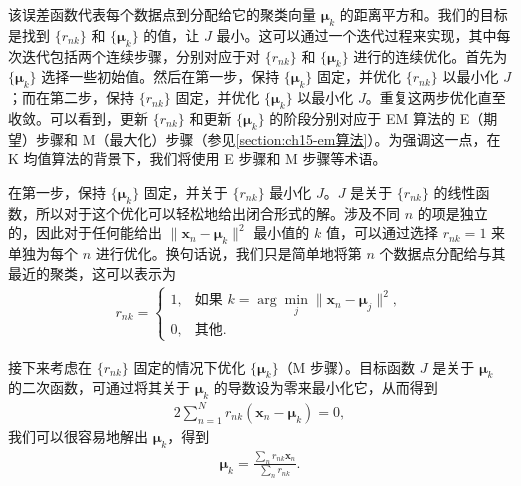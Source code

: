 \documentclass[../../main.tex]{subfiles}
\begin{document}
该误差函数代表每个数据点到分配给它的聚类向量 $\bm{\mu}_k$ 的距离平方和。我们的目标是找到 $\{r_{nk}\}$ 和 $\{\bm{\mu}_k\}$ 的值，让 $J$ 最小。这可以通过一个迭代过程来实现，其中每次迭代包括两个连续步骤，分别对应于对 $\{r_{nk}\}$ 和 $\{\bm{\mu}_k\}$ 进行的连续优化。首先为 $\{\bm{\mu}_k\}$ 选择一些初始值。然后在第一步，保持 $\{\bm{\mu}_k\}$ 固定，并优化 $\{r_{nk}\}$ 以最小化 $J$；而在第二步，保持 $\{r_{nk}\}$ 固定，并优化 $\{\bm{\mu}_k\}$ 以最小化 $J$。重复这两步优化直至收敛。可以看到，更新 $\{r_{nk}\}$ 和更新 $\{\bm{\mu}_k\}$ 的阶段分别对应于 EM 算法的 E（期望）步骤和 M（最大化）步骤（参见\cref{section:ch15-em算法}）。为强调这一点，在 K 均值算法的背景下，我们将使用 E 步骤和 M 步骤等术语。

在第一步，保持 $\{\bm{\mu}_k\}$ 固定，并关于 $\{r_{nk}\}$ 最小化 $J$。$J$ 是关于 $\{r_{nk}\}$ 的线性函数，所以对于这个优化可以轻松地给出闭合形式的解。涉及不同 $n$ 的项是独立的，因此对于任何能给出 $\|\bm{x}_n-\bm{\mu}_k\|^2$ 最小值的 $k$ 值，可以通过选择 $r_{nk}=1$ 来单独为每个 $n$ 进行优化。换句话说，我们只是简单地将第 $n$ 个数据点分配给与其最近的聚类，这可以表示为
\begin{align}
r_{nk}=
\begin{cases}
1, & \text{如果 }k=\arg\min_j\|\bm{x}_n-\bm{\mu}_j\|^2,\\
0, & \text{其他}.
\end{cases}
\label{align:ch15-kmeans-assign}
\end{align}

接下来考虑在 $\{r_{nk}\}$ 固定的情况下优化 $\{\bm{\mu}_k\}$（M 步骤）。目标函数 $J$ 是关于 $\bm{\mu}_k$ 的二次函数，可通过将其关于 $\bm{\mu}_k$ 的导数设为零来最小化它，从而得到
\begin{align}
2\sum_{n=1}^{N}r_{nk}(\bm{x}_n-\bm{\mu}_k)=0,
\label{align:ch15-kmeans-mu-deriv}
\end{align}
我们可以很容易地解出 $\bm{\mu}_k$，得到
\begin{align}
\bm{\mu}_k=\frac{\sum_n r_{nk}\bm{x}_n}{\sum_n r_{nk}}.
\label{align:ch15-kmeans-mu}
\end{align}
\end{document}
